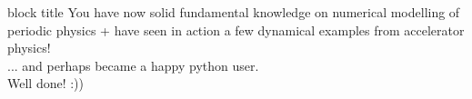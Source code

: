 \documentclass[a4paper,graphics,t]{beamer} %
\begin{document}
\begin{frame}
    \begin{beamercolorbox}[sep=12pt,center]{block title}
        You have now solid fundamental knowledge on numerical modelling of periodic physics + have seen in action a few dynamical examples from accelerator physics! \\[1em]
        ... and perhaps became a happy python user. \\[1em]
        Well done! :))
    \end{beamercolorbox}
\end{frame}



\end{document}
